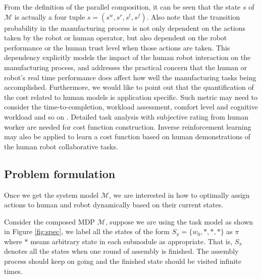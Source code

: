 \documentclass[journal]{IEEEtran}
\begin{document}
From the definition of the parallel composition, it can be seen that the state $s$ of $\mathcal{M}$ is actually a four tuple $s=(s^w,s^r,s^t,s^f)$. Also note that the transition probability in the manufacturing process is not only dependent on the actions taken by the robot or human operator, but also dependent on the robot performance or the human trust level when those actions are taken. This dependency explicitly models the impact of the human robot interaction on the manufacturing process, and addresses the practical concern that the human or robot's real time performance does affect how well the manufacturing tasks being accomplished. Furthermore, we would like to point out that the quantification of the cost related to human models is application specific. Such metric may need to consider the time-to-completion, workload assessment,  comfort level and cognitive workload and so on \cite{fujieSharedAutonomy}. Detailed task analysis with subjective rating from human worker are needed for cost function construction. Inverse reinforcement learning  \cite{abbeel2004apprenticeship} may also be applied to learn a cost function based on human demonstrations of the human robot collaborative tasks.  
\subsection{Problem formulation} 
Once we get the system model $\mathcal{M}$, we are interested in how to optimally assign actions to human and robot dynamically based on their current states. %

%

Consider the composed MDP $\mathcal{M}$, suppose we are using the task model as shown in Figure \ref{fig:spec}, we label all the states of the form $S_{\pi}=\{w_0,*,*,*\}$ as $\pi$ where $*$ means arbitrary state in each submodule as appropriate. That is, $S_{\pi}$ denotes all the states when one round of assembly is finished. The assembly process should keep on going and the finished state should be visited infinite times.
\end{document}
